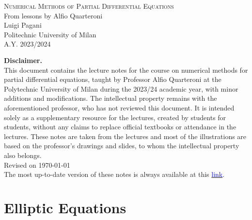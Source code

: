 \documentclass[11pt]{book}
\begin{document}
\begin{center}
	{\Huge \textsc{Numerical Methods of Partial Differential Equations}}\\
	\vspace*{1cm}
	{\large From lessons by Alfio Quarteroni}\\
	\vspace*{0.1cm}
	{\large {Luigi Pagani}}\\
	\vspace*{1cm}
	Politechnic University of Milan\\
	A.Y. 2023/2024
\end{center}




\vspace*{\fill}
\textbf{Disclaimer.} \\
This document contains the lecture notes for the course on numerical methods for partial differential equations, taught by Professor Alfio Quarteroni at the Polytechnic University of Milan during the 2023/24 academic year, with minor additions and modifications.
The intellectual property remains with the aforementioned professor, who has not reviewed this document. It is intended solely as a supplementary resource for the lectures, created by students for students, without any claims to replace official textbooks or attendance in the lectures. These notes are taken from the lectures and most of the illustrations are based on the professor's drawings and slides, to whom the intellectual property also belongs. \\

Revised on \today \\ 

The most up-to-date version of these notes is always available at this \href{https://www.overleaf.com/read/yqysrsbvccht#946a7e2}{\textcolor{blue}{link}}.

\vspace*{\fill}



\tableofcontents

\chapter{Elliptic Equations}
\end{document}
